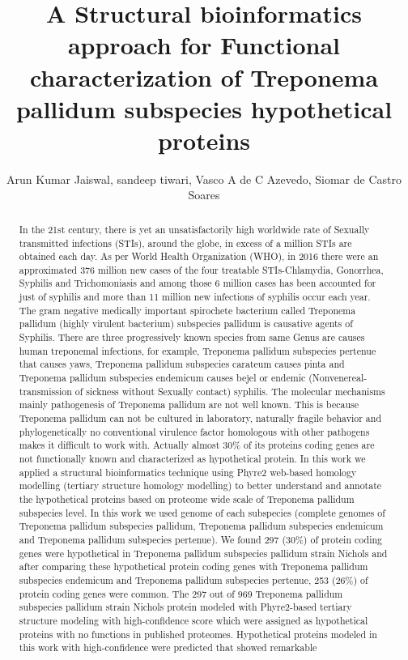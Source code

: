 \documentclass[twoside]{article}
\title{\vspace{-15mm}\fontsize{24pt}{10pt}\selectfont\textbf{ A Structural bioinformatics approach for Functional characterization of Treponema pallidum subspecies hypothetical proteins }} %
\author{ Arun Kumar Jaiswal, sandeep tiwari, Vasco A de C Azevedo, Siomar de Castro Soares }
\affil{ Universidade Federal do Tri\^angulo Mineiro }
\date{}
\begin{document}
  
  
  \maketitle %
  
  
  \thispagestyle{fancy} %
  
  
  \begin{abstract}
  In the 21st century,  there is yet an unsatisfactorily high worldwide rate of Sexually transmitted infections (STIs),  around the globe,  in excess of a million STIs are obtained each day. As per World Health Organization (WHO),  in 2016 there were an approximated 376 million new cases of the four treatable STIs-Chlamydia,  Gonorrhea,  Syphilis and Trichomoniasis and among those 6 million cases has been accounted for just of syphilis and more than 11 million new infections of syphilis occur each year. The gram negative medically important spirochete bacterium called Treponema pallidum (highly virulent bacterium) subspecies pallidum is causative agents of Syphilis. There are three progressively known species from same Genus are causes human treponemal infections,  for example,  Treponema pallidum subspecies pertenue that causes yaws,  Treponema pallidum subspecies carateum causes pinta and Treponema pallidum subspecies endemicum causes bejel or endemic (Nonvenereal-transmission of sickness without Sexually contact) syphilis. The molecular mechanisms mainly pathogenesis of Treponema pallidum are not well known. This is because Treponema pallidum can not be cultured in laboratory,  naturally fragile behavior and phylogenetically no conventional virulence factor homologous with other pathogens makes it difficult to work with. Actually almost 30\% of its proteins coding genes are not functionally known and characterized as hypothetical protein. In this work we applied a structural bioinformatics technique using Phyre2 web-based homology modelling (tertiary structure homology modelling) to better understand and annotate the hypothetical proteins based on proteome wide scale of Treponema pallidum subspecies level. In this work we used genome of each subspecies (complete genomes of Treponema pallidum subspecies pallidum,  Treponema pallidum subspecies endemicum and Treponema pallidum subspecies pertenue). We found 297 (30\%) of protein coding genes were hypothetical in Treponema pallidum subspecies pallidum strain Nichols and after comparing these hypothetical protein coding genes with Treponema pallidum subspecies endemicum and Treponema pallidum subspecies pertenue,  253 (26\%) of protein coding genes were common. The 297 out of 969 Treponema pallidum subspecies pallidum strain Nichols protein modeled with Phyre2-based tertiary structure modeling with high-confidence score which were assigned as hypothetical proteins with no functions in published proteomes. Hypothetical proteins modeled in this work with high-confidence were predicted that showed remarkable 
\end{abstract}
\end{document}
